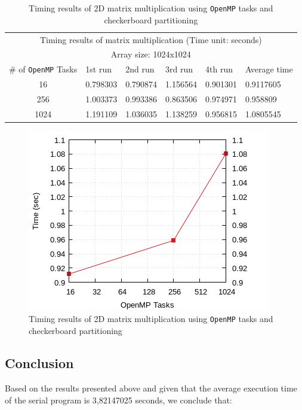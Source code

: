 \documentclass{article}
\begin{document}
\begin{table}[htbp]
  \centering
    \begin{tabular}{|c||l|l|l|l|l|} 
    \hline
    \multicolumn{6}{|c|}{Timing results of matrix multiplication (Time unit: seconds)} \\
    \multicolumn{6}{|c|}{Array size: 1024x1024} \\
    \hline
   \# of \texttt{OpenMP} Tasks & 1st run & 2nd run & 3rd run & 4th run & Average time\\ [0.5ex] 
    \hline\hline
    16 & 0.798303 & 0.790874 & 1.156564 & 0.901301 & 0.9117605 \\ 
    \hline
    256 & 1.003373 & 0.993386 & 0.863506 & 0.974971 & 0.958809 \\
    \hline
    1024 & 1.191109 & 1.036035 & 1.138259 & 0.956815 & 1.0805545 \\ [1ex]
    \hline
    \end{tabular}
  \caption{Timing results of 2D matrix multiplication using \texttt{OpenMP}
           tasks and checkerboard partitioning}
\end{table}


\begin{figure}[htbp]
  \centering
  \includegraphics[width=0.55\columnwidth]{../../hw2/ex3/plots/matmul.png}
  \caption{Timing results of 2D matrix multiplication using \texttt{OpenMP}
           tasks and checkerboard partitioning}
\end{figure}


\subsection{Conclusion}
Based on the results presented above and given that the average execution time of the serial
program is 3,82147025 seconds, we conclude that:
\end{document}
